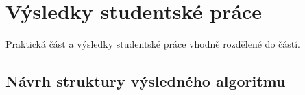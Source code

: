 \chapter{Výsledky studentské práce}

Praktická část a výsledky studentské práce vhodně rozdělené do částí.

\section{Návrh struktury výsledného algoritmu}